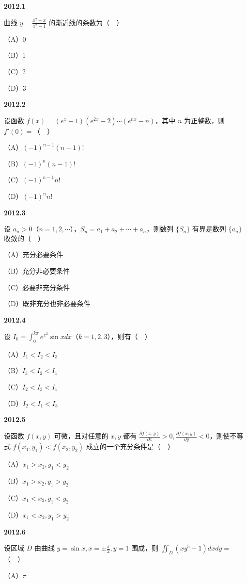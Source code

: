 \documentclass[UTF8,12pt,fontset=windows]{ctexart}
\begin{document}
{\large\bfseries 2012.1}

曲线 $y = \frac{x^2 + x}{x^2 - 1}$ 的渐近线的条数为（　）

（A）0

（B）1

（C）2

（D）3

\vfill
\newpage
{\large\bfseries 2012.2}

设函数 $f(x) = (e^x - 1)(e^{2x} - 2)\cdots(e^{nx} - n)$，其中 $n$ 为正整数，则 $f'(0) =$（　）

（A）$(-1)^{n-1}(n-1)!$

（B）$(-1)^n(n-1)!$

（C）$(-1)^{n-1}n!$

（D）$(-1)^nn!$

\vfill
\newpage
{\large\bfseries 2012.3}

设 $a_n > 0$（$n = 1, 2, \cdots$），$S_n = a_1 + a_2 + \cdots + a_n$，则数列 $\{S_n\}$ 有界是数列 $\{a_n\}$ 收敛的（　）

（A）充分必要条件

（B）充分非必要条件

（C）必要非充分条件

（D）既非充分也非必要条件

\vfill
\newpage
{\large\bfseries 2012.4}

设 $I_k = \int_0^{k\pi} e^{x^2}\sin x dx$（$k = 1, 2, 3$），则有（　）

（A）$I_1 < I_2 < I_3$

（B）$I_3 < I_2 < I_1$

（C）$I_2 < I_3 < I_1$

（D）$I_2 < I_1 < I_3$

\vfill
\newpage
{\large\bfseries 2012.5}

设函数 $f(x, y)$ 可微，且对任意的 $x, y$ 都有 $\frac{\partial f(x, y)}{\partial x} > 0, \frac{\partial f(x, y)}{\partial y} < 0$，则使不等式 $f(x_1, y_1) < f(x_2, y_2)$ 成立的一个充分条件是（　）

（A）$x_1 > x_2, y_1 < y_2$

（B）$x_1 > x_2, y_1 > y_2$

（C）$x_1 < x_2, y_1 < y_2$

（D）$x_1 < x_2, y_1 > y_2$

\vfill
\newpage
{\large\bfseries 2012.6}

设区域 $D$ 由曲线 $y = \sin x, x = \pm\frac{\pi}{2}, y = 1$ 围成，则 $\iint_D (xy^5 - 1)dxdy =$（　）

（A）$\pi$
\end{document}
